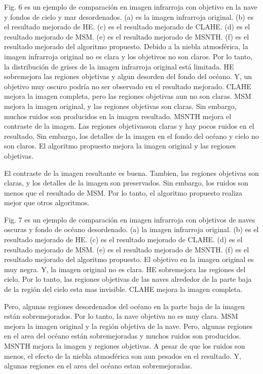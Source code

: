 \documentclass[a4paper, 11 pt, conference]{ieeeconf}      %
\begin{document}
Fig. 6 es un ejemplo de comparaci\'on en imagen infrarroja con objetivo en la nave y fondos de cielo y mar desordenados. (a) es la imagen infrarroja original. (b) es el resultado mejorado de HE. (c) es el resultado mejorado de CLAHE. (d) es el resultado mejorado de MSM. (e) es el resultado mejorado de MSNTH. (f) es el resultado mejorado del algoritmo propuesto. Debido a la niebla atmosf\'erica, la imagen infrarroja original no es clara y los objetivos no son claros. Por lo tanto, la distribuci\'on de grises de la imagen infrarroja original est\'a limitada. HE sobremejora las regiones objetivas y algun desorden del fondo del oc\'eano. Y, un objetivo muy oscuro podr\'ia no ser observado en el resultado mejorado.  CLAHE mejora la imagen completa, pero las regiones objetivas aun no son claras. MSM mejora la imagen original, y las regiones objetivas son claras. Sin embargo, muchos ruidos son producidos en la imagen resultado. MSNTH mejora el contraste de la imagen. Las regiones objetivasson claras y hay pocos ruidos en el resultado. Sin embargo, los detalles de la imagen en el fondo del oc\'eano y cielo no son claros. El algoritmo propuesto mejora la imagen original y las regiones objetivas.

El contraste de la imagen resultante es buena. Tambien, las regiones objetivas son claras, y los detalles de la imagen son preservados. Sin embargo, los ruidos son menos que el resultado de MSM. Por lo tanto, el algoritmo propuesto realiza mejor que otros algoritmos.

Fig. 7 es un ejemplo de comparaci\'on en imagen infrarroja con objetivos de naves oscuras y fondo de oc\'eano desordenado. (a) la imagen infrarroja original. (b) es el resultado mejorado de HE. (c) es el resultado mejorado de CLAHE. (d) es el resultado mejorado de MSM. (e) es el resultado mejorado de MSNTH. (f) es el resultado mejorado del algoritmo propuesto. El objetivo en la imagen original es muy negra. Y, la imagen original no es clara. HE sobremejora las regiones del cielo. Por lo tanto, las regiones objetivas de las naves alrededor de la parte baja de la regi\'on del cielo esta mas invisible. CLAHE mejora la imagen completa. 

Pero, algunas regiones desordenados del oc\'eano en la parte baja de la imagen est\'an sobremejorados. Por lo tanto, la nave objetiva no es muy clara. MSM mejora la imagen original y la regi\'on objetiva de la nave. Pero, algunas regiones en el area del oc\'eano est\'an sobremejoradas y muchos ruidos son producidos. MSNTH mejora la imagen y regiones objetivas. A pesar de que los ruidos son menos, el efecto de la niebla atmosf\'erica son aun pesados en el resultado. Y, algunas regiones en el area del oc\'eano estan sobremejoradas.
\end{document}
